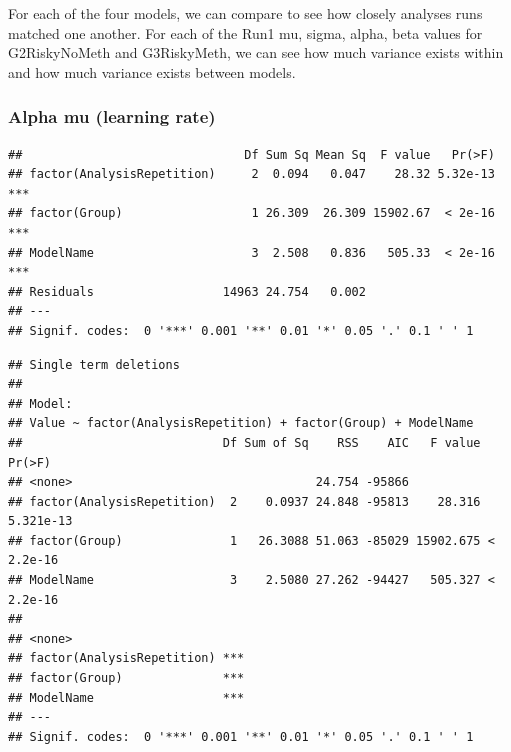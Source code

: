 \documentclass[]{article}
\newenvironment{Shaded}{\begin{snugshade}}{\end{snugshade}}
\newcommand{\KeywordTok}[1]{\textcolor[rgb]{0.13,0.29,0.53}{\textbf{{#1}}}}
\newcommand{\StringTok}[1]{\textcolor[rgb]{0.31,0.60,0.02}{{#1}}}
\newcommand{\CommentTok}[1]{\textcolor[rgb]{0.56,0.35,0.01}{\textit{{#1}}}}
\newcommand{\OtherTok}[1]{\textcolor[rgb]{0.56,0.35,0.01}{{#1}}}
\newcommand{\NormalTok}[1]{{#1}}
\begin{document}
For each of the four models, we can compare to see how closely analyses
runs matched one another. For each of the Run1 mu, sigma, alpha, beta
values for G2RiskyNoMeth and G3RiskyMeth, we can see how much variance
exists within and how much variance exists between models.

\begin{Shaded}
\end{Shaded}

\subsubsection{Alpha mu (learning rate)}\label{alpha-mu-learning-rate}

\begin{verbatim}
##                               Df Sum Sq Mean Sq  F value   Pr(>F)    
## factor(AnalysisRepetition)     2  0.094   0.047    28.32 5.32e-13 ***
## factor(Group)                  1 26.309  26.309 15902.67  < 2e-16 ***
## ModelName                      3  2.508   0.836   505.33  < 2e-16 ***
## Residuals                  14963 24.754   0.002                      
## ---
## Signif. codes:  0 '***' 0.001 '**' 0.01 '*' 0.05 '.' 0.1 ' ' 1
\end{verbatim}

\begin{verbatim}
## Single term deletions
## 
## Model:
## Value ~ factor(AnalysisRepetition) + factor(Group) + ModelName
##                            Df Sum of Sq    RSS    AIC   F value    Pr(>F)
## <none>                                  24.754 -95866                    
## factor(AnalysisRepetition)  2    0.0937 24.848 -95813    28.316 5.321e-13
## factor(Group)               1   26.3088 51.063 -85029 15902.675 < 2.2e-16
## ModelName                   3    2.5080 27.262 -94427   505.327 < 2.2e-16
##                               
## <none>                        
## factor(AnalysisRepetition) ***
## factor(Group)              ***
## ModelName                  ***
## ---
## Signif. codes:  0 '***' 0.001 '**' 0.01 '*' 0.05 '.' 0.1 ' ' 1
\end{verbatim}
\end{document}
